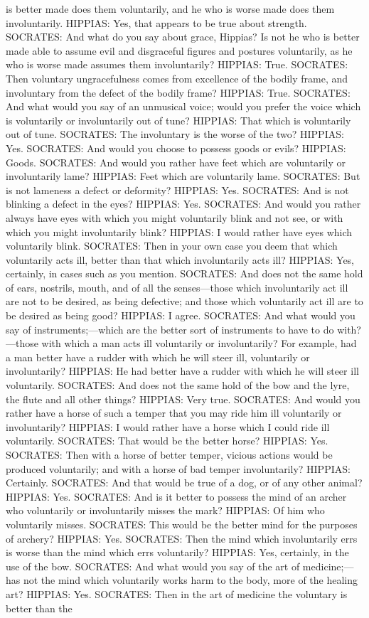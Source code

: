 \documentclass[11pt,letter]{article}
\begin{document}
is better made does them voluntarily, and he who is worse made does them involuntarily. HIPPIAS:  Yes, that appears to be true about strength. SOCRATES:  And what do you say about grace, Hippias? Is not he who is better made able to assume evil and disgraceful figures and postures voluntarily, as he who is worse made assumes them involuntarily? HIPPIAS:  True. SOCRATES:  Then voluntary ungracefulness comes from excellence of the bodily frame, and involuntary from the defect of the bodily frame? HIPPIAS:  True. SOCRATES:  And what would you say of an unmusical voice; would you prefer the voice which is voluntarily or involuntarily out of tune? HIPPIAS:  That which is voluntarily out of tune. SOCRATES:  The involuntary is the worse of the two? HIPPIAS:  Yes. SOCRATES:  And would you choose to possess goods or evils? HIPPIAS:  Goods. SOCRATES:  And would you rather have feet which are voluntarily or involuntarily lame? HIPPIAS:  Feet which are voluntarily lame. SOCRATES:  But is not lameness a defect or deformity? HIPPIAS:  Yes. SOCRATES:  And is not blinking a defect in the eyes? HIPPIAS:  Yes. SOCRATES:  And would you rather always have eyes with which you might voluntarily blink and not see, or with which you might involuntarily blink? HIPPIAS:  I would rather have eyes which voluntarily blink. SOCRATES:  Then in your own case you deem that which voluntarily acts ill, better than that which involuntarily acts ill? HIPPIAS:  Yes, certainly, in cases such as you mention. SOCRATES:  And does not the same hold of ears, nostrils, mouth, and of all the senses—those which involuntarily act ill are not to be desired, as being defective; and those which voluntarily act ill are to be desired as being good? HIPPIAS:  I agree. SOCRATES:  And what would you say of instruments;—which are the better sort of instruments to have to do with?—those with which a man acts ill voluntarily or involuntarily? For example, had a man better have a rudder with which he will steer ill, voluntarily or involuntarily? HIPPIAS:  He had better have a rudder with which he will steer ill voluntarily. SOCRATES:  And does not the same hold of the bow and the lyre, the flute and all other things? HIPPIAS:  Very true. SOCRATES:  And would you rather have a horse of such a temper that you may ride him ill voluntarily or involuntarily? HIPPIAS:  I would rather have a horse which I could ride ill voluntarily. SOCRATES:  That would be the better horse? HIPPIAS:  Yes. SOCRATES:  Then with a horse of better temper, vicious actions would be produced voluntarily; and with a horse of bad temper involuntarily? HIPPIAS:  Certainly. SOCRATES:  And that would be true of a dog, or of any other animal? HIPPIAS:  Yes. SOCRATES:  And is it better to possess the mind of an archer who voluntarily or involuntarily misses the mark? HIPPIAS:  Of him who voluntarily misses. SOCRATES:  This would be the better mind for the purposes of archery? HIPPIAS:  Yes. SOCRATES:  Then the mind which involuntarily errs is worse than the mind which errs voluntarily? HIPPIAS:  Yes, certainly, in the use of the bow. SOCRATES:  And what would you say of the art of medicine;—has not the mind which voluntarily works harm to the body, more of the healing art? HIPPIAS:  Yes. SOCRATES:  Then in the art of medicine the voluntary is better than the 
\end{document}
